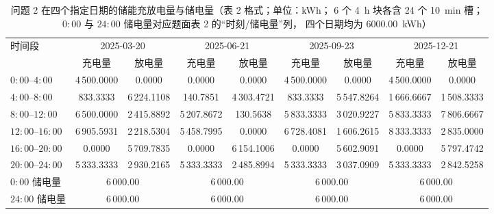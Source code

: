 \begin{table}[htbp]
  \centering
  \caption{问题 2 在四个指定日期的储能充放电量与储电量（表 2 格式；单位：kWh；
           6 个 4~h 块各含 24 个 10~min 槽；\(0{:}00\) 与 \(24{:}00\) 储电量对应题面表 2 的“时刻/储电量”列，
           四个日期均为 \(6000.00\)~kWh）}
  \label{tab:q2-t2}
  \footnotesize
  \setlength{\tabcolsep}{4pt}
  \begin{tabular}{l*{4}{cc}}
    \toprule
    \multirow{2}{*}{时间段} & \multicolumn{2}{c}{2025-03-20} & \multicolumn{2}{c}{2025-06-21}
                            & \multicolumn{2}{c}{2025-09-23} & \multicolumn{2}{c}{2025-12-21} \\
    \cmidrule(lr){2-3}\cmidrule(lr){4-5}\cmidrule(lr){6-7}\cmidrule(lr){8-9}
     & 充电量 & 放电量 & 充电量 & 放电量 & 充电量 & 放电量 & 充电量 & 放电量 \\
    \midrule
    \(0{:}00\)--\(4{:}00\)   & 4\,500.0000 & 0.0000 & 0.0000 & 0.0000 & 4\,500.0000 & 0.0000 & 4\,500.0000 & 0.0000 \\
    \(4{:}00\)--\(8{:}00\)   & 833.3333 & 6\,224.1108 & 140.7851 & 4\,303.4721 & 833.3333 & 5\,547.8264 & 1\,666.6667 & 1\,508.3333 \\
    \(8{:}00\)--\(12{:}00\)  & 6\,500.0000 & 2\,415.8892 & 5\,207.8672 & 130.5638 & 5\,833.3333 & 3\,020.9227 & 5\,833.3333 & 7\,806.6667 \\
    \(12{:}00\)--\(16{:}00\) & 6\,905.5931 & 2\,218.5304 & 5\,458.7995 & 0.0000 & 6\,728.4081 & 1\,606.2615 & 8\,333.3333 & 2\,835.0000 \\
    \(16{:}00\)--\(20{:}00\) & 0.0000 & 5\,709.7835 & 0.0000 & 6\,154.1006 & 0.0000 & 5\,602.9091 & 0.0000 & 5\,797.4742 \\
    \(20{:}00\)--\(24{:}00\) & 5\,333.3333 & 2\,930.2165 & 5\,333.3333 & 2\,485.8994 & 5\,333.3333 & 3\,037.0909 & 5\,333.3333 & 2\,842.5258 \\
    \midrule
    \(0{:}00\) 储电量 & \multicolumn{2}{c}{6\,000.00} & \multicolumn{2}{c}{6\,000.00}
                      & \multicolumn{2}{c}{6\,000.00} & \multicolumn{2}{c}{6\,000.00} \\
    \(24{:}00\) 储电量 & \multicolumn{2}{c}{6\,000.00} & \multicolumn{2}{c}{6\,000.00}
                       & \multicolumn{2}{c}{6\,000.00} & \multicolumn{2}{c}{6\,000.00} \\
    \bottomrule
  \end{tabular}
\end{table}
